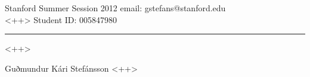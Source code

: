 \documentclass[a4paper,draft, final]{scrartcl}
\begin{document}
\noindent Stanford Summer Session 2012 \hfill email: gstefans@stanford.edu\\
<++> \hfill Student ID: 005847980
\rule[8pt]{\textwidth}{1pt}
\begin{center}
	\LARGE{<++>}
	\vspace{0.4cm}

	\large{Guðmundur Kári Stefánsson}
	<++>
\end{center}
\end{document}
